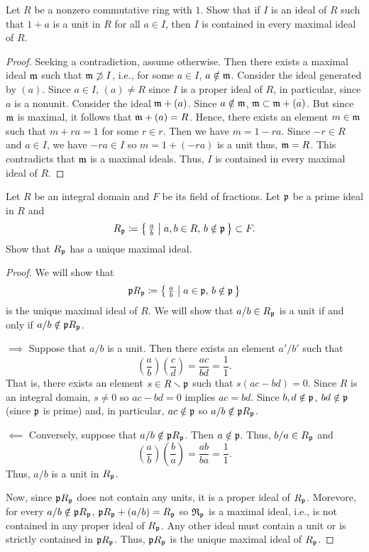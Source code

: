 \begin{problem}
Let $R$ be a nonzero commutative ring with $1$. Show that if $I$ is an
ideal of $R$ such that $1+a$ is a unit in $R$ for all $a\in I$, then $I$ is
contained in every maximal ideal of $R$.
\end{problem}
\begin{proof}
Seeking a contradiction, assume otherwise. Then there exists a maximal
ideal $\mathfrak{m}$ such that $\mathfrak{m}\not\supset I$, i.e., for some $a\in I$,
$a\notin\mathfrak{m}$. Consider the ideal generated by $(a)$. Since $a\in I$,
$(a)\neq R$ since $I$ is a proper ideal of $R$, in particular, since $a$ is
a nonunit. Consider the ideal $\mathfrak{m}+(a)$. Since $a\notin\mathfrak{m}$,
$\mathfrak{m}\subset\mathfrak{m}+(a)$. But since $\mathfrak{m}$ is maximal, it follows that
$\mathfrak{m}+(a)=R$. Hence, there exists an element $m\in\mathfrak{m}$ such that
$m+ra=1$ for some $r\in r$. Then we have $m=1-ra$. Since $-r\in R$ and
$a\in I$, we have $-ra\in I$ so $m=1+(-ra)$ is a unit thus,
$\mathfrak{m}=R$. This contradicts that $\mathfrak{m}$ is a maximal ideals. Thus, $I$
is contained in every maximal ideal of $R$.
\end{proof}

\begin{problem}
Let $R$ be an integral domain and $F$ be its field of fractions. Let
$\mathfrak{p}$ be a prime ideal in $R$ and
\[
R_{\mathfrak{p}}\coloneqq
\left\{\,\tfrac{a}{b}\;\middle|\;a,b\in R,\,b\notin\mathfrak{p}\,\right\}\subset F.
\]
Show that $R_{\mathfrak{p}}$ has a unique maximal ideal.
\end{problem}
\begin{proof}
We will show that
\[
\mathfrak{p}
R_{\mathfrak{p}}\coloneqq\left\{\,\tfrac{a}{b}\;\middle|\;a\in\mathfrak{p},\,b\notin\mathfrak{p}\,\right\}
\]
is the unique maximal ideal of $R$. We will show that $a/b\in R_{\mathfrak{p}}$ is
a unit if and only if $a/b\notin\mathfrak{p} R_{\mathfrak{p}}$.

$\implies$ Suppose that $a/b$ is a unit. Then there exists an element
$a'/b'$ such that
\[
\left(\frac{a}{b}\right)\left(\frac{c}{d}\right)=\frac{ac}{bd}=\frac{1}{1}.
\]
That is, there exists an element $s\in R\minus\frakp$ such that
$s(ac-bd)=0$. Since $R$ is an integral domain, $s\neq 0$ so $ac-bd=0$
implies $ac=bd$. Since $b,d\notin\mathfrak{p}$, $bd\notin\mathfrak{p}$ (since $\mathfrak{p}$
is prime) and, in particular, $ac\notin\mathfrak{p}$ so $a/b\notin\mathfrak{p}
R_{\mathfrak{p}}$.

$\impliedby$ Conversely, suppose that $a/b\notin\mathfrak{p} R_{\mathfrak{p}}$. Then
$a\notin\mathfrak{p}$. Thus, $b/a\in R_{\mathfrak{p}}$ and
\[
\left(\frac{a}{b}\right)\left(\frac{b}{a}\right)=\frac{ab}{ba}=\frac{1}{1}.
\]
Thus, $a/b$ is a unit in $R_{\mathfrak{p}}$.

Now, since $\mathfrak{p} R_{\mathfrak{p}}$ does not contain any units, it is a proper
ideal of $R_{\mathfrak{p}}$. Morevore, for every $a/b\notin\mathfrak{p} R_{\mathfrak{p}}$,
$\mathfrak{p} R_{\mathfrak{p}} +(a/b)=R_{\mathfrak{p}}$ so $\frak R_{\mathfrak{p}}$ is a maximal ideal,
i.e., is not contained in any proper ideal of $R_{\mathfrak{p}}$. Any other ideal
must contain a unit or is strictly contained in $\mathfrak{p} R_{\mathfrak{p}}$. Thus,
$\mathfrak{p} R_{\mathfrak{p}}$ is the unique maximal ideal of $R_{\mathfrak{p}}$.
\end{proof}

